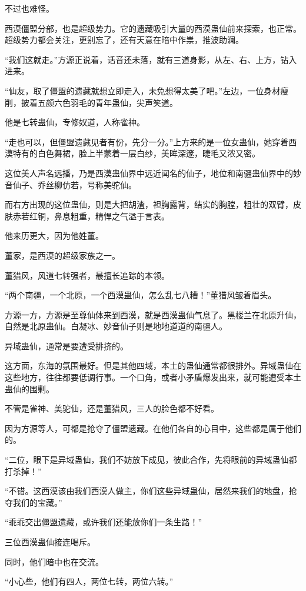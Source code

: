 \begin{this_body}
不过也难怪。

西漠僵盟分部，也是超级势力。它的遗藏吸引大量的西漠蛊仙前来探索，也正常。超级势力都会关注，更别忘了，还有天意在暗中作祟，推波助澜。

“我们这就走。”方源正说着，话音还未落，就有三道身影，从左、右、上方，钻入进来。

“仙友，取了僵盟的遗藏就想立即走入，未免想得太美了吧。”左边，一位身材瘦削，披着五颜六色羽毛的青年蛊仙，尖声笑道。

他是七转蛊仙，专修奴道，人称雀神。

“走也可以，但僵盟遗藏见者有份，先分一分。”上方来的是一位女蛊仙，她穿着西漠特有的白色舞裙，脸上半蒙着一层白纱，美眸深邃，睫毛又浓又密。

这位美人声名远播，乃是西漠蛊仙界中远近闻名的仙子，地位和南疆蛊仙界中的妙音仙子、乔丝柳仿若，号称美驼仙。

而右方出现的这位蛊仙，则是大把胡渣，袒胸露背，结实的胸膛，粗壮的双臂，皮肤赤若红铜，鼻息粗重，精悍之气溢于言表。

他来历更大，因为他姓董。

董家，是西漠的超级家族之一。

董猎风，风道七转强者，最擅长追踪的本领。

“两个南疆，一个北原，一个西漠蛊仙，怎么乱七八糟！”董猎风皱着眉头。

方源一方，方源是至尊仙体来到西漠，就是西漠蛊仙气息了。黑楼兰在北原升仙，自然是北原蛊仙。白凝冰、妙音仙子则是地地道道的南疆人。

异域蛊仙，通常是要遭受排挤的。

这方面，东海的氛围最好。但是其他四域，本土的蛊仙通常都很排外。异域蛊仙在这些地方，往往都要低调行事。一个口角，或者小矛盾爆发出来，就可能遭受本土蛊仙的围剿。

不管是雀神、美驼仙，还是董猎风，三人的脸色都不好看。

因为方源等人，可都是抢夺了僵盟遗藏。在他们各自的心目中，这些都是属于他们的。

“二位，眼下是异域蛊仙，我们不妨放下成见，彼此合作，先将眼前的异域蛊仙都打杀掉！”

“不错。这西漠该由我们西漠人做主，你们这些异域蛊仙，居然来我们的地盘，抢夺我们的宝藏。”

“乖乖交出僵盟遗藏，或许我们还能放你们一条生路！”

三位西漠蛊仙接连喝斥。

同时，他们暗中也在交流。

“小心些，他们有四人，两位七转，两位六转。”


\end{this_body}
